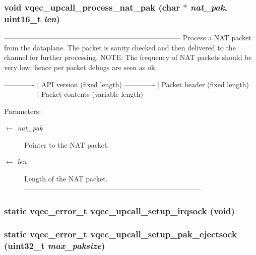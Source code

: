 \subsubsection{\setlength{\rightskip}{0pt plus 5cm}void vqec\_\-upcall\_\-process\_\-nat\_\-pak (char $\ast$ {\em nat\_\-pak}, uint16\_\-t {\em len})}\label{vqec__upcall__event_8c_2c765af9da16410e1b6cdfa7a574f93b}


--------------------------------------------------------------------------- Process a NAT packet from the dataplane. The packet is sanity checked and then delivered to the channel for further processing. NOTE: The frequency of NAT packets should be very low, hence per packet debugs are seen as ok.

------------- $|$ API version (fixed length) ------------- $|$ Packet header (fixed length) ------------- $|$ Packet contents (variable length) -------------

\begin{Desc}
\item[Parameters:]
\begin{description}
\item[\mbox{$\leftarrow$} {\em nat\_\-pak}]Pointer to the NAT packet. \item[\mbox{$\leftarrow$} {\em len}]Length of the NAT packet. --------------------------------------------------------------------------- \end{description}
\end{Desc}
\subsubsection{\setlength{\rightskip}{0pt plus 5cm}static vqec\_\-error\_\-t vqec\_\-upcall\_\-setup\_\-irqsock (void)\hspace{0.3cm}{\tt  [static]}}\label{vqec__upcall__event_8c_cfbbc0c42c4490669d7ca9020d3737bc}


\subsubsection{\setlength{\rightskip}{0pt plus 5cm}static vqec\_\-error\_\-t vqec\_\-upcall\_\-setup\_\-pak\_\-ejectsock (uint32\_\-t {\em max\_\-paksize})\hspace{0.3cm}{\tt  [static]}}\label{vqec__upcall__event_8c_1a0532545466e26383cdfa71fb2876ea}


